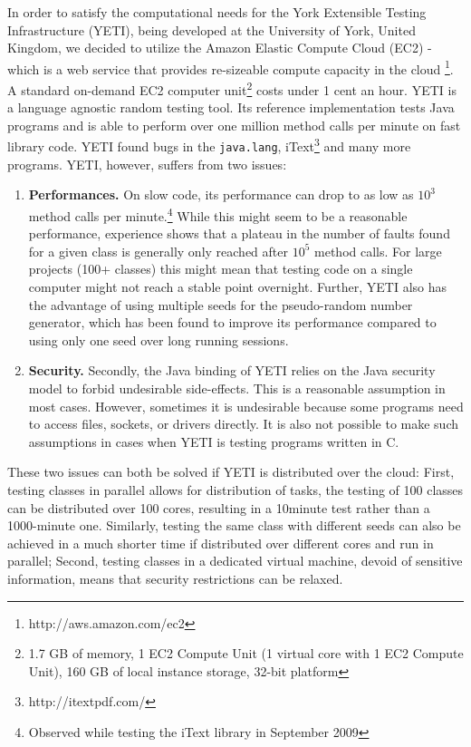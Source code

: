 \documentclass [a4paper, 11pt, twoside] {report}
\begin{document}
In order to satisfy the computational needs for the York Extensible Testing Infrastructure (YETI), being developed at the University of York, United Kingdom, we decided to utilize the Amazon Elastic Compute Cloud (EC2) - which is a web service that provides re-sizeable compute capacity in the cloud \footnote{http://aws.amazon.com/ec2}. A standard on-demand EC2 computer unit\footnote{1.7 GB of memory, 1 EC2 Compute Unit (1 virtual core with 1 EC2 Compute Unit), 160 GB of local instance storage, 32-bit platform} costs under 1 cent an hour. YETI is a language agnostic random testing tool. Its reference implementation tests Java programs and is able to perform over one million method calls per minute on fast library code. YETI found bugs in the \texttt{java.lang}, iText\footnote{http://itextpdf.com/} and many more programs. YETI, however, suffers from two issues:
\begin{enumerate}
\item \textbf{Performances.} On slow code, its performance can drop to as low as $10^{3}$
method calls per minute.\footnote{Observed while testing the iText library in 
September 2009} While this might seem to be a reasonable performance, experience shows 
that a plateau in the number of faults found for a given class is generally only reached after 
$10^{5}$ method calls. For large projects (100+ classes) this might mean that testing 
code on a single computer might not reach a stable point overnight. Further, YETI also has the advantage of
using multiple seeds for the pseudo-random number generator, which has been found to improve its performance compared to using only one seed over long running sessions.
\item \textbf{Security.} Secondly, the Java binding of YETI relies on the Java security model to forbid 
undesirable side-effects. This is a reasonable assumption in most cases. However,
sometimes it is undesirable because some programs need to access files, sockets, or drivers 
directly. It is also not possible to make such assumptions in cases when YETI is testing  programs written in C.
\end{enumerate}

These two issues can both be solved if YETI is distributed over the cloud: First, testing classes in parallel
allows for distribution of tasks,  the testing of 100 classes can be distributed over 100 cores, resulting in a 10minute test rather than a 1000-minute one. Similarly, testing the same class with different seeds can also be achieved in a much shorter time if distributed over different cores and run in parallel; Second, testing classes in a dedicated virtual machine, devoid of sensitive information, means that security restrictions can be relaxed.
\end{document}
